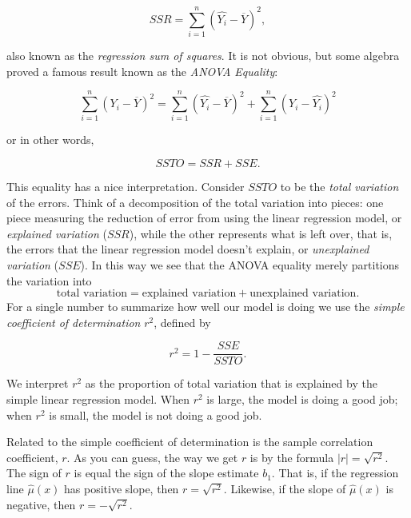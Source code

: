 \documentclass[]{book}
\numberwithin{equation}{chapter}
\numberwithin{figure}{chapter}
\theoremstyle{plain}
\theoremstyle{definition}
\theoremstyle{remark}
\theoremstyle{definition}
\theoremstyle{definition}
\theoremstyle{remark}
\begin{document}
\begin{equation}
SSR=\sum_{i=1}^{n}(\hat{Y_{i}}-\overline{Y})^{2},
\end{equation}

also known as the \emph{regression sum of squares}. It is not obvious,
but some algebra proved a famous result known as the \emph{ANOVA
Equality}:

\begin{equation}
\label{eq-anovaeq}
\sum_{i=1}^{n}(Y_{i}-\overline{Y})^{2}=\sum_{i=1}^{n}(\hat{Y_{i}}-\overline{Y})^{2}+\sum_{i=1}^{n}(Y_{i}-\hat{Y_{i}})^{2}
\end{equation}

or in other words,

\begin{equation}
SSTO=SSR+SSE.
\end{equation}

This equality has a nice interpretation. Consider \(SSTO\) to be the
\emph{total variation} of the errors. Think of a decomposition of the
total variation into pieces: one piece measuring the reduction of error
from using the linear regression model, or \emph{explained variation}
(\(SSR\)), while the other represents what is left over, that is, the
errors that the linear regression model doesn't explain, or
\emph{unexplained variation} (\(SSE\)). In this way we see that the
ANOVA equality merely partitions the variation into \[ \mbox{total
variation}=\mbox{explained variation}+\mbox{unexplained variation}.
\] For a single number to summarize how well our model is doing we use
the \emph{simple coefficient of determination} \(r^{2}\), defined by

\begin{equation}
r^{2}=1-\frac{SSE}{SSTO}.
\end{equation}

We interpret \(r^{2}\) as the proportion of total variation that is
explained by the simple linear regression model. When \(r^{2}\) is
large, the model is doing a good job; when \(r^{2}\) is small, the model
is not doing a good job.

Related to the simple coefficient of determination is the sample
correlation coefficient, \(r\). As you can guess, the way we get \(r\)
is by the formula \(|r|=\sqrt{r^{2}}\). The sign of \(r\) is equal the
sign of the slope estimate \(b_{1}\). That is, if the regression line
\(\hat{\mu}(x)\) has positive slope, then \(r=\sqrt{r^{2}}\). Likewise,
if the slope of \(\hat{\mu}(x)\) is negative, then \(r=-\sqrt{r^{2}}\).
\end{document}
